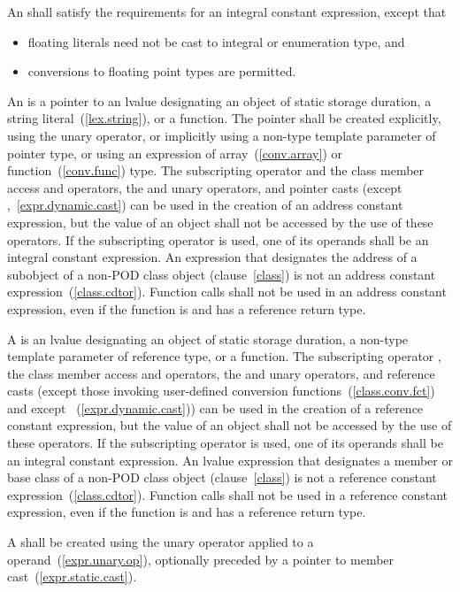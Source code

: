\pnum
An  shall satisfy the requirements
for an integral constant expression, except that

\begin{itemize}
\item floating literals need not be cast to integral or enumeration type, and
\item conversions to floating point types are permitted.
\end{itemize}

\pnum
An  is a pointer to an lvalue designating
an object of static storage duration, a string literal~(\ref{lex.string}),
or a function. The pointer shall be created explicitly, using the unary
\tcode{\&} operator, or implicitly using a non-type template parameter of
pointer type, or using an expression of array~(\ref{conv.array}) or
function~(\ref{conv.func}) type. The subscripting operator \tcode{[]} and
the class member access  and \tcode{->} operators, the \tcode{\&}
and \tcode{*} unary operators, and pointer casts (except
,~\ref{expr.dynamic.cast}) can be used in the
creation of an address constant expression, but the value of an object
shall not be accessed by the use of these operators. If the subscripting
operator is used, one of its operands shall be an integral constant
expression. An expression that designates the address of a subobject of
a non-POD class object (clause~\ref{class}) is not an address constant
expression~(\ref{class.cdtor}). Function calls shall not be used in an
address constant expression, even if the function is  and
has a reference return type.

\pnum
A  is an lvalue designating an object
of static storage duration, a non-type template parameter of reference
type, or a function. The subscripting operator \tcode{[]}, the class
member access  and \tcode{->} operators, the \tcode{\&} and
\tcode{*} unary operators, and reference casts (except those invoking
user-defined conversion functions~(\ref{class.conv.fct}) and except
~(\ref{expr.dynamic.cast})) can be used in the
creation of a reference constant expression, but the value of an object
shall not be accessed by the use of these operators. If the subscripting
operator is used, one of its operands shall be an integral constant
expression. An lvalue expression that designates a member or base class of
a non-POD class object (clause~\ref{class}) is not a reference constant
expression~(\ref{class.cdtor}). Function calls shall not be used in a
reference constant expression, even if the function is  and
has a reference return type.

\pnum
A  shall be created using the
unary \tcode{\&} operator applied to a 
operand~(\ref{expr.unary.op}), optionally preceded by a pointer to member
cast~(\ref{expr.static.cast}).%
